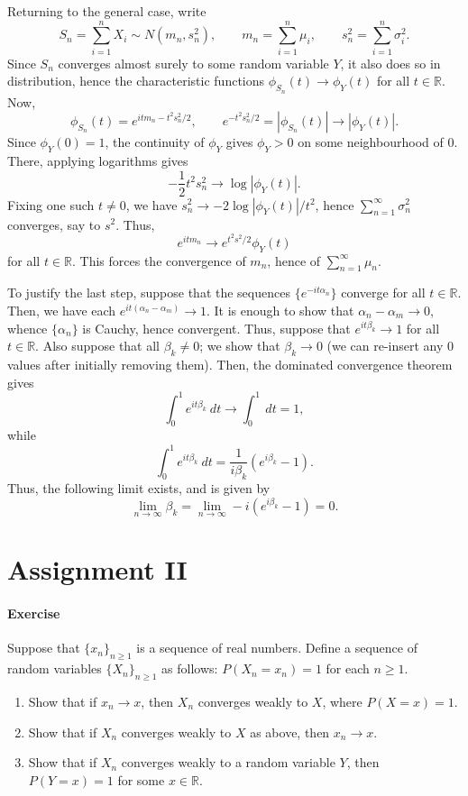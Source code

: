 \documentclass[10pt]{article}
\newcounter{prob}
\newcommand{\problem}{\stepcounter{prob}\paragraph{Exercise \arabic{prob}}}
\newcommand{\R}{\mathbb{R}}
\begin{document}
    Returning to the general case, write \[
        S_n = \sum_{i = 1}^n X_i \sim N(m_n, s_n^2), \qquad
        m_n = \sum_{i = 1}^n \mu_i, \qquad
        s_n^2 = \sum_{i = 1}^n \sigma_i^2.
    \] Since $S_n$ converges almost surely to some random variable $Y$, it also does
    so in distribution, hence the characteristic functions $\phi_{S_n}(t) \to
    \phi_Y(t)$ for all $t \in \R$. Now, \[
        \phi_{S_n}(t) = e^{itm_n - t^2s_n^2 / 2}, \qquad
        e^{-t^2s_n^2 / 2} = |\phi_{S_n}(t)| \to |\phi_Y(t)|.
    \] Since $\phi_Y(0) = 1$, the continuity of $\phi_Y$ gives $\phi_Y > 0$ on some
    neighbourhood of $0$. There, applying logarithms gives \[
        -\frac{1}{2} t^2 s_n^2 \to \log{|\phi_Y(t)|}.
    \] Fixing one such $t \neq 0$, we have $s_n^2 \to -2\log{|\phi_Y(t)|} / t^2$,
    hence $\sum_{n = 1}^\infty \sigma_n^2$ converges, say to $s^2$. Thus, \[
        e^{itm_n} \to e^{t^2 s^2 / 2} \phi_Y(t)
    \] for all $t \in \R$. This forces the convergence of $m_n$, hence of $\sum_{n =
    1}^\infty \mu_n$.

    To justify the last step, suppose that the sequences $\{e^{-it\alpha_n}\}$
    converge for all $t \in \R$. Then, we have each $e^{it(\alpha_n - \alpha_m)} \to
    1$. It is enough to show that $\alpha_n - \alpha_m \to 0$, whence $\{\alpha_n\}$
    is Cauchy, hence convergent. Thus, suppose that $e^{it\beta_k} \to 1$ for all $t
    \in \R$. Also suppose that all $\beta_k \neq 0$; we show that $\beta_k \to 0$ (we
    can re-insert any $0$ values after initially removing them). Then, the dominated
    convergence theorem gives \[
        \int_0^1 e^{it\beta_k} \:dt \to \int_0^1 \:dt = 1,
    \] while \[
        \int_0^1 e^{it\beta_k} \:dt = \frac{1}{i\beta_k}(e^{i\beta_k} - 1).
    \] Thus, the following limit exists, and is given by \[
        \lim_{n \to \infty} \beta_k = \lim_{n \to \infty} -i(e^{i\beta_k} - 1) = 0.
    \]




    \clearpage
    \section*{Assignment II}
    \setcounter{prob}{0}

    \problem Suppose that $\{x_n\}_{n \geq 1}$ is a sequence of real numbers. Define
    a sequence of random variables $\{X_n\}_{n \geq 1}$ as follows: $P(X_n = x_n) =
    1$ for each $n \geq 1$.
    \begin{enumerate}
        \item Show that if $x_n \to x$, then $X_n$ converges weakly to $X$, where
        $P(X = x) = 1$.

        \item Show that if $X_n$ converges weakly to $X$ as above, then $x_n \to x$.
        \item Show that if $X_n$ converges weakly to a random variable $Y$, then $P(Y
        = x) = 1$ for some $x \in \R$.
    \end{enumerate}
\end{document}
